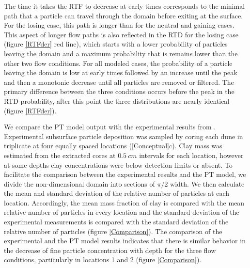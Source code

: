 \documentclass[draft,linenumbers]{agujournal2018}
\begin{document}
The time it takes the RTF to decrease at early times corresponds to the minimal path that a particle can travel through the domain before exiting at the surface. For the losing case, this path is longer than for the neutral and gaining cases. This aspect of longer flow paths is also reflected in the RTD for the losing case (figure \ref{RTFder} red line), which starts with a lower probability of particles leaving the domain and a maximum probability that is remains lower than the other two flow conditions. For all modeled cases, the probability of a particle leaving the domain is low at early times followed by an increase until the peak and then a monotonic decrease until all particles are removed or filtered. The primary difference between the three conditions occurs before the peak in the RTD probability, after this point the three distributions are nearly identical (figure \ref{RTFder}).

We compare the PT model output with the experimental results from \citet{Fox2014,Fox2018}. Experimental subsurface particle deposition was sampled by coring each dune in triplicate at four equally spaced locations (\ref{Conceptual}c). Clay mass was estimated from the extracted cores at $0.5 \ cm$ intervals for each location, however at some depths clay concentrations were below detection limits or absent. To facilitate the comparison between the experimental results and the PT model, we divide the non-dimensional domain into sections of $\pi/2$ width. We then calculate the mean and standard deviation of the relative number of particles at each location. Accordingly, the mean mass fraction of clay is compared with the mean relative number of particles in every location and the standard deviation of the experimental measurements is compared with the standard deviation of the relative number of particles (figure \ref{Comparison}). The comparison of the experimental and the PT model results indicates that there is similar behavior in the decrease of fine particle concentration with depth for the three flow conditions, particularly in locations 1 and 2 (figure \ref{Comparison}).  
\end{document}
